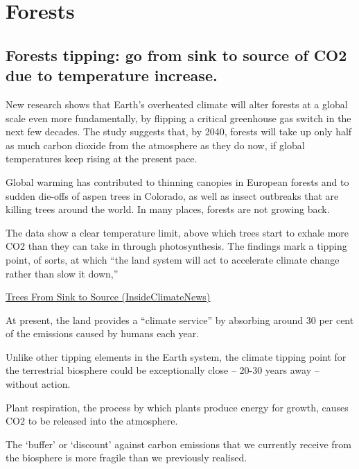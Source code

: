 \documentclass[
]{book}
\begin{document}
\hypertarget{forests}{%
\chapter{Forests}\label{forests}}

\hypertarget{forests-tipping-go-from-sink-to-source-of-co2-due-to-temperature-increase.}{%
\section{Forests tipping: go from sink to source of CO2 due to temperature increase.}\label{forests-tipping-go-from-sink-to-source-of-co2-due-to-temperature-increase.}}

New research shows that Earth's overheated climate will
alter forests at a global scale even more fundamentally,
by flipping a critical greenhouse gas switch in the next few decades.
The study suggests that, by 2040, forests will take up only
half as much carbon dioxide from the atmosphere as they do now,
if global temperatures keep rising at the present pace.

Global warming has contributed to thinning canopies in European forests
and to sudden die-offs of aspen trees in Colorado,
as well as insect outbreaks that are killing trees around the world.
In many places, forests are not growing back.

The data show a clear temperature limit,
above which trees start to exhale more CO2 than they can take in through photosynthesis.
The findings mark a tipping point, of sorts, at which ``the land system will act to accelerate climate change rather than slow it down,''

\href{https://insideclimatenews.org/news/13012021/forests-heat-climate-change/}{Trees From Sink to Source (InsideClimateNews)}

At present, the land provides a ``climate service'' by absorbing
around 30 per cent of the emissions caused by humans each year.

Unlike other tipping elements in the Earth system, the climate tipping point
for the terrestrial biosphere could be exceptionally close --
20-30 years away -- without action.

Plant respiration, the process by which plants produce energy for growth,
causes CO2 to be released into the atmosphere.

The `buffer' or `discount' against carbon emissions that we currently receive from the biosphere is more fragile than we previously realised.
\end{document}

